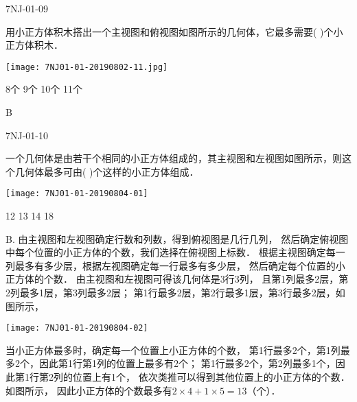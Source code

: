 \begin{defproblem}{7NJ-01-09}%
\begin{onlyproblem}%
用小正方体积木搭出一个主视图和俯视图如图所示的几何体，它最多需要(    )个小正方体积木．
\begin{center}
\texttt{[image: 7NJ01-01-20190802-11.jpg]}
\end{center}

\xx
{8个}
{9个}
{10个}
{11个}


\end{onlyproblem}%
\begin{onlysolution}%
\begin{solution}%
B
\end{solution}%
\end{onlysolution}%
\end{defproblem}




\begin{defproblem}{7NJ-01-10}%
\begin{onlyproblem}%
一个几何体是由若干个相同的小正方体组成的，其主视图和左视图如图所示，则这个几何体最多可由(    )个这样的小正方体组成． 
\begin{center}
\texttt{[image: 7NJ01-01-20190804-01]}
\end{center}

\xx
{12}
{13}
{14}
{18}

\end{onlyproblem}%
\begin{onlysolution}%
\begin{solution}%
B. 
由主视图和左视图确定行数和列数，得到俯视图是几行几列， 然后确定俯视图中每个位置的小正方体的个数，我们选择在俯视图上标数． 根据主视图确定每一列最多有多少层，根据左视图确定每一行最多有多少层， 然后确定每个位置的小正方体的个数． 由主视图和左视图可得该几何体是3行3列， 且第1列最多2层，第2列最多1层，第3列最多2层； 第1行最多2层，第2行最多1层，第3行最多2层，如图所示，
\begin{center}
\texttt{[image: 7NJ01-01-20190804-02]}
\end{center}
当小正方体最多时，确定每一个位置上小正方体的个数， 第1行最多2个，第1列最多2个，因此第1行第1列的位置上最多有2个； 第1行最多2个，第2列最多1个，因此第1行第2列的位置上有1个， 依次类推可以得到其他位置上的小正方体的个数．如图所示，   因此小正方体的个数最多有$2\times4+1\times5=13$（个）． 
\end{solution}%
\end{onlysolution}%
\end{defproblem}





